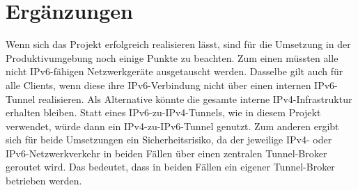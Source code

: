\section{Ergänzungen}



Wenn sich das Projekt erfolgreich realisieren lässt, sind für die Umsetzung in der Produktivumgebung noch einige Punkte zu beachten. Zum einen müssten alle nicht IPv6-fähigen Netzwerkgeräte ausgetauscht werden. Dasselbe gilt auch für alle Clients, wenn diese ihre IPv6-Verbindung nicht über einen internen IPv6-Tunnel realisieren. Als Alternative könnte die gesamte interne IPv4-Infrastruktur erhalten bleiben. Statt eines IPv6-zu-IPv4-Tunnels, wie in diesem Projekt verwendet, würde dann ein IPv4-zu-IPv6-Tunnel genutzt. Zum anderen ergibt sich für beide Umsetzungen ein Sicherheitsrisiko, da der jeweilige IPv4- oder IPv6-Netzwerkverkehr in beiden Fällen über einen zentralen Tunnel-Broker geroutet wird. Das bedeutet, dass in beiden Fällen ein eigener Tunnel-Broker betrieben werden.
